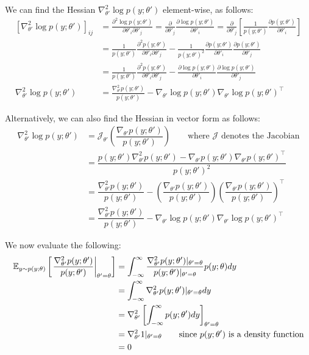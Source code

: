 \begin{answer}
We can find the Hessian $\nabla_{\theta'}^2 \log p(y;\theta')$ element-wise, as follows:
\newcommand{\dti}{\partial \theta'_i}
\newcommand{\dtj}{\partial \theta'_j}
\begin{align*}
\left[ \nabla_{\theta'}^2 \log p(y;\theta') \right]_{ij}
&= \frac{\partial^2 \log p(y;\theta')}{\dti \dtj}
= \frac{\partial}{\dtj} \frac{\partial \log p(y;\theta')}{\dti}
= \frac{\partial}{\dtj} \left[ \frac{1}{p(y;\theta')} \frac{\partial p(y;\theta')}{\dti} \right] \\
&= \frac{1}{p(y;\theta')} \frac{\partial^2 p(y;\theta')}{\dti \dtj} - \frac{1}{p(y;\theta')^2} \frac{\partial p(y;\theta')}{\dti} \frac{\partial p(y;\theta')}{\dtj} \\
&= \frac{1}{p(y;\theta')} \frac{\partial^2 p(y;\theta')}{\dti \dtj} - \frac{\partial \log p(y;\theta')}{\dti} \frac{\partial \log p(y;\theta')}{\dtj} \\
\nabla_{\theta'}^2 \log p(y;\theta')
&= \frac{\nabla_{\theta'}^2 p(y;\theta')}{p(y;\theta')} - \nabla_{\theta'} \log p(y;\theta') \nabla_{\theta'} \log p(y;\theta')^\top
\end{align*}

Alternatively, we can also find the Hessian in vector form as follows:
\begin{align*}
\nabla_{\theta'}^2 \log p(y;\theta')
&= \mathcal{J}_{\theta'} \left( \dfrac{\nabla_{\theta'} p(y;\theta')}{p(y;\theta')} \right) \quad\quad \text{where $\mathcal{J}$ denotes the Jacobian} \\
&= \dfrac{p(y;\theta') \nabla_{\theta'}^2 p(y;\theta')-\nabla_{\theta'} p(y;\theta') \nabla_{\theta'} p(y;\theta')^\top}{p(y;\theta')^2} \\
&= \dfrac{\nabla^2_{\theta'} p(y;\theta')}{p(y;\theta')} - \left( \dfrac{\nabla_{\theta'} p(y;\theta')}{p(y;\theta')} \right)\left( \dfrac{\nabla_{\theta'} p(y;\theta')}{p(y;\theta')} \right)^\top \\
&= \dfrac{\nabla_{\theta'}^2 p(y;\theta')}{p(y;\theta')} - \nabla_{\theta'} \log p(y;\theta') \nabla_{\theta'} \log p(y;\theta')^\top
\end{align*}

We now evaluate the following:
\begin{align*}
\mathbb{E}_{y \sim p(y;\theta)} \left[ \left. \dfrac{\nabla_{\theta'}^2 p(y;\theta')}{p(y;\theta')} \right|_{\theta'=\theta}\right]
&= \int_{-\infty}^\infty \dfrac{\nabla_{\theta'}^2 p(y;\theta')|_{\theta'=\theta}}{p(y;\theta')|_{\theta'=\theta}} p(y;\theta) dy \\
&= \int_{-\infty}^\infty \nabla_{\theta'}^2 p(y;\theta')|_{\theta'=\theta} dy \\
&= \nabla_{\theta'}^2 \left[ \int_{-\infty}^\infty p(y;\theta') dy \right]_{\theta'=\theta} \\
&= \nabla_{\theta'}^2 1|_{\theta'=\theta} \quad\quad \text{since $p(y;\theta')$ is a density function} \\
&= 0
\end{align*}


\end{answer}
